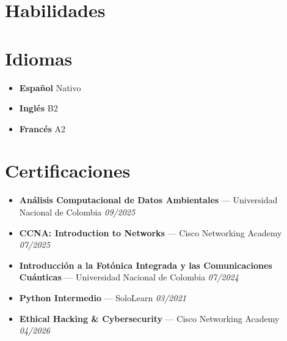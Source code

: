 \documentclass[11pt,a4paper]{article}
\begin{document}
\section{Habilidades}
\begin{tcolorbox}[colback=lightgray, colframe=lightgray, boxrule=0pt, arc=6pt, left=10pt, right=10pt, top=10pt, bottom=10pt]
\noindent
\linespread{1.8}\selectfont
{}
\end{tcolorbox}

\section{Idiomas}
\begin{itemize}[label={}, leftmargin=0.3cm, itemsep=4pt]
    \item \textbf{Español} \hfill Nativo
    \quad \textcolor{accent}{\faCircle \faCircle \faCircle \faCircle \faCircle}
    \item \textbf{Inglés} \hfill B2
    \quad \textcolor{accent}{\faCircle \faCircle \faCircle \faCircle}
    \textcolor{bulletline}{\faCircle}
    \item \textbf{Francés} \hfill A2
    \quad \textcolor{accent}{\faCircle \faCircle}
    \textcolor{bulletline}{\faCircle \faCircle \faCircle}
\end{itemize}

\section{Certificaciones}
\begin{itemize}[label={\color{accent}\faAward}, leftmargin=0.6cm, itemsep=4pt]
    \item \textbf{Análisis Computacional de Datos Ambientales}
    --- Universidad Nacional de Colombia
    \hfill \textit{09/2025}
    \item \textbf{CCNA: Introduction to Networks}
    --- Cisco Networking Academy
    \hfill \textit{07/2025}
    \item \textbf{Introducción a la Fotónica Integrada y las Comunicaciones Cuánticas}
    --- Universidad Nacional de Colombia
    \hfill \textit{07/2024}
    \item \textbf{Python Intermedio}
    --- SoloLearn
    \hfill \textit{03/2021}
    \item \textbf{Ethical Hacking \& Cybersecurity}
    --- Cisco Networking Academy
    \hfill \textit{04/2026}
\end{itemize}

\vfill
\begin{center}
    {\footnotesize\color{subtletext}
    \textit{}}
\end{center}
\end{document}

